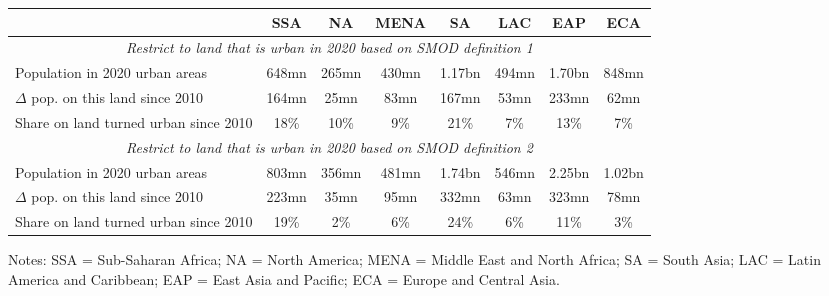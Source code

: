 
\begin{tabular}{lccccccc}
\hline\hline
         & SSA & NA & MENA & SA & LAC & EAP & ECA \\
\hline
         \multicolumn{8}{c}{\it Restrict to land that is urban in 2020 based on SMOD definition 1}\\
\hline
     Population in 2020 urban areas         & 648mn & 265mn & 430mn & 1.17bn & 494mn & 1.70bn & 848mn \\
     $\Delta$ pop. on this land since 2010  & 164mn & 25mn & 83mn & 167mn & 53mn & 233mn & 62mn \\
     Share on land turned urban since 2010  & 18\% & 10\% & 9\% & 21\% & 7\% & 13\% & 7\% \\
\hline
         \multicolumn{8}{c}{\it Restrict to land that is urban in 2020 based on SMOD definition 2}\\
\hline
     Population in 2020 urban areas         & 803mn & 356mn & 481mn & 1.74bn & 546mn & 2.25bn & 1.02bn \\
     $\Delta$ pop. on this land since 2010  & 223mn & 35mn & 95mn & 332mn & 63mn & 323mn & 78mn \\
     Share on land turned urban since 2010  & 19\% & 2\% & 6\% & 24\% & 6\% & 11\% & 3\% \\
\hline\hline
\end{tabular}
\vspace{0.5em}
\begin{flushleft}
\footnotesize Notes: SSA = Sub-Saharan Africa; NA = North America; MENA = Middle East and North Africa; SA = South Asia; LAC = Latin America and Caribbean; EAP = East Asia and Pacific; ECA = Europe and Central Asia.
\end{flushleft}
